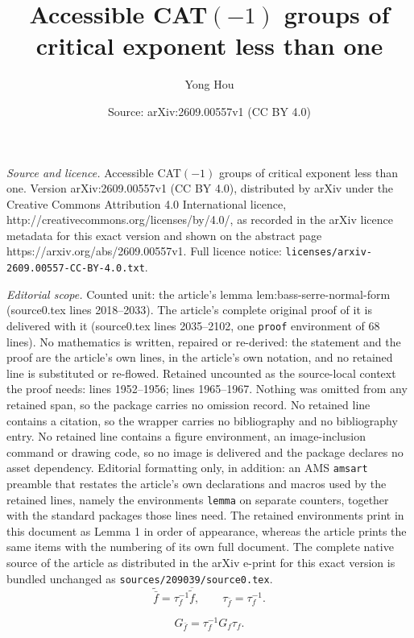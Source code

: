 \documentclass[10pt,a4paper]{amsart}
\title{Accessible CAT$(-1)$ groups of critical exponent less than one}
\author{Yong Hou}
\date{Source: arXiv:2609.00557v1 (CC BY 4.0)}
\begin{document}
\maketitle

\noindent\emph{Source and licence.} Accessible CAT$(-1)$ groups of critical exponent less than one. Version arXiv:2609.00557v1 (CC BY 4.0), distributed by arXiv under the Creative Commons Attribution 4.0 International licence, http://creativecommons.org/licenses/by/4.0/, as recorded in the arXiv licence metadata for this exact version and shown on the abstract page https://arxiv.org/abs/2609.00557v1. Full licence notice: \texttt{licenses/arxiv-2609.00557-CC-BY-4.0.txt}.\par\smallskip

\noindent\textit{Editorial scope.} Counted unit: the article's lemma lem:bass-serre-normal-form (source0.tex lines 2018--2033). The article's complete original proof of it is delivered with it (source0.tex lines 2035--2102, one \texttt{proof} environment of 68 lines). No mathematics is written, repaired or re-derived: the statement and the proof are the article's own lines, in the article's own notation, and no retained line is substituted or re-flowed.  Retained uncounted as the source-local context the proof needs: lines 1952--1956; lines 1965--1967.  Nothing was omitted from any retained span, so the package carries no omission record.  No retained line contains a citation, so the wrapper carries no bibliography and no bibliography entry.  No retained line contains a figure environment, an image-inclusion command or drawing code, so no image is delivered and the package declares no asset dependency.  Editorial formatting only, in addition: an AMS \texttt{amsart} preamble that restates the article's own declarations and macros used by the retained lines, namely the environments \texttt{lemma} on separate counters, together with the standard packages those lines need.  The retained environments print in this document as Lemma 1 in order of appearance, whereas the article prints the same items with the numbering of its own full document.  The complete native source of the article as distributed in the arXiv e-print for this exact version is bundled unchanged as \texttt{sources/209039/source0.tex}.
\begin{equation}\label{eq:reverse-edge-lifts}
 \widetilde{\bar f}=\tau_f^{-1}\overline{\widetilde f},
 \qquad
 \tau_{\bar f}=\tau_f^{-1}.
\end{equation}

\begin{equation}\label{eq:reverse-edge-stabilizer}
 G_{\bar f}=\tau_f^{-1}G_f\tau_f.
\end{equation}
\end{document}
